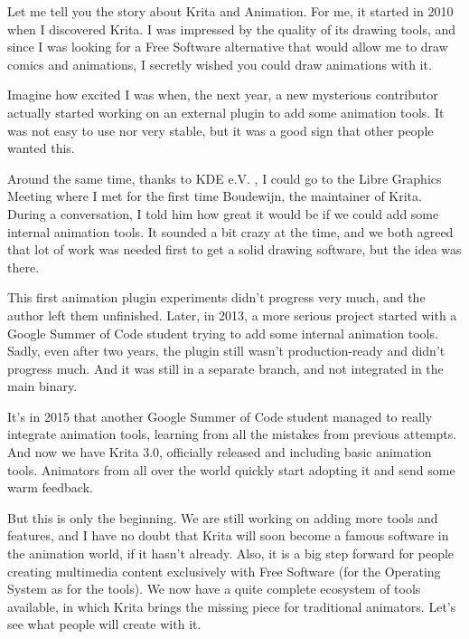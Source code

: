 

\noindent{}Let me tell you the story about Krita and Animation. For me, it started in 2010 when I discovered Krita. I was impressed by the quality of its drawing tools, and since I was looking for a Free Software alternative that would allow me to draw comics and animations, I secretly wished you could draw animations with it. 

Imagine how excited I was when, the next year, a new mysterious contributor actually started working on an external plugin to add some animation tools. It was not easy to use nor very stable, but it was a good sign that other people wanted this. 

Around the same time, thanks to KDE e.V. , I could go to the Libre Graphics Meeting where I met for the first time Boudewijn, the maintainer of Krita. During a conversation, I told him how great it would be if we could add some internal animation tools. It sounded a bit crazy at the time, and we both agreed that lot of work was needed first to get a solid drawing software, but the idea was there.

This first animation plugin experiments didn’t progress very much, and the author left them unfinished. Later, in 2013, a more serious project started with a Google Summer of Code student trying to add some internal animation tools. Sadly, even after two years, the plugin still wasn’t production-ready and didn’t progress much. And it was still in a separate branch, and not integrated in the main binary.

It’s in 2015 that another Google Summer of Code student managed to really integrate animation tools, learning from all the mistakes from previous attempts. And now we have Krita 3.0, officially released and including basic animation tools. Animators from all over the world quickly start adopting it and send some warm feedback.

But this is only the beginning. We are still working on adding more tools and features, and I have no doubt that Krita will soon become a famous software in the animation world, if it hasn’t already. Also, it is a big step forward for people creating multimedia content exclusively with Free Software (for the Operating System as for the tools). We now have a quite complete ecosystem of tools available, in which Krita brings the missing piece for traditional animators. Let’s see what people will create with it.


